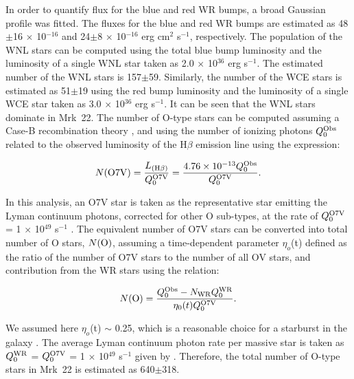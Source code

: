 \documentclass[useAMS,usenatbib]{mn2e}
\begin{document}
In order to quantify flux for the blue and red WR bumps, a broad Gaussian profile was fitted. The fluxes for the blue and red WR bumps are estimated as 48$\pm$16 $\times$ 10$^{-16}$ and 24$\pm$8 $\times$ 10$^{-16}$ erg cm$^{2}$ s$^{-1}$, respectively. The population of the WNL stars can be computed using the total blue bump luminosity and the luminosity of a single WNL star taken as 2.0 $\times$ 10$^{36}$ erg s$^{-1}$. The estimated number of the WNL stars is 157$\pm$59. Similarly, the number of the WCE stars is estimated as 51$\pm$19 using the red bump luminosity and the luminosity of a single WCE star taken as 3.0 $\times$ 10$^{36}$ erg s$^{-1}$. It can be seen that the WNL stars dominate in Mrk~22. The number of O-type stars can be computed assuming a Case-B recombination theory \citep{1987MNRAS.224..801H}, and using the number of ionizing photons $Q^{\rm Obs}_0$ related to the observed luminosity of the H${\beta}$ emission line using the expression: 

\begin{equation}
N({\rm O7V}) = \frac {L_{({\rm H}\beta)}}{Q^{\rm O7V}_0} = \frac {4.76\times10^{-13}Q^{\rm Obs}_0}{Q^{\rm O7V}_0}.
\end{equation}

In this analysis, an O{\small{7V}} star is taken as the representative star emitting the Lyman continuum photons, corrected for other O sub-types, at the rate of  $Q^{\rm O7V}_0$ = 1 $\times$ 10$^{49}$ s$^{-1}$ \citep{1990ApJS...73....1L,2006MNRAS.368.1822H}. The equivalent number of O{\small{7V}} stars can be converted into total number of O stars, $N({\rm O})$, assuming a time-dependent parameter $\eta_{o}$(t) defined as the ratio of the number of O{\small{7V}} stars to the number of all O{\small{V}} stars, and contribution from the WR stars using the relation:

\begin{equation}
N({\rm O})=\frac{Q^{\rm Obs}_0 - N_{\rm WR}Q^{\rm WR}_0}{\eta_0(t)Q^{\rm O7V}_0}.
\end{equation}

We assumed here $\eta_{o}$(t) $\sim$ 0.25, which is a reasonable choice for a starburst in the galaxy \citep{1998ApJ...497..618S}. The average Lyman continuum photon rate per massive star is taken as $Q^{\rm WR}_0$ = $Q^{\rm O7V}_0$ = 1 $\times$ 10$^{49}$ s$^{-1}$ given by \citet{1999A&A...341..399S}. Therefore, the total number of O-type stars in Mrk~22 is estimated as 640$\pm$318.
\end{document}
